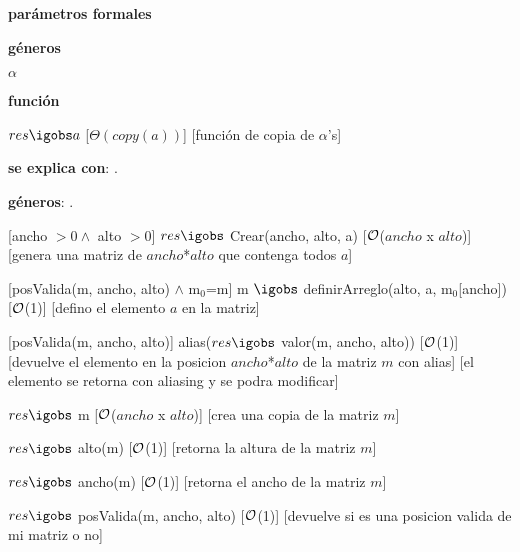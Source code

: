\begin{Interfaz}

	\textbf{parámetros formales}\parindent\\
	\parbox{1.7cm}{\textbf{géneros}} $\alpha$\\	\parbox[t]{1.7cm}{\textbf{función}}\parbox[t]{\textwidth-2\parindent-1.7cm}{%
	{$res \igobs a$}
	[$\Theta(copy(a))$]
	[función de copia de $\alpha$'s]
	}

	\textbf{se explica con}: .

	\textbf{géneros}: .


	[ancho $> 0 \land$ alto $>0$]
	{$res \igobs$ Crear(ancho, alto, a)}
	[$\mathcal{O}$($ancho$ x $alto$)]
	[genera una matriz de $ancho$*$alto$ que contenga todos $a$]

	[posValida(m, ancho, alto) $\land$ m$_0$=m]
	{m $\igobs$ definirArreglo(alto, a, m$_0$[ancho])}%
	[$\mathcal{O}$(1)]
	[defino el elemento $a$ en la matriz]
	
	[posValida(m, ancho, alto)]
	{alias($res \igobs$ valor(m, ancho, alto))}
	[$\mathcal{O}$(1)]
	[devuelve el elemento en la posicion $ancho$*$alto$ de la matriz $m$ con alias]
	[el elemento se retorna con aliasing y se podra modificar]

	{$res \igobs$ m}  
	[$\mathcal{O}$($ancho$ x $alto$)]
	[crea una copia de la matriz $m$]

	{$res \igobs$ alto(m)}  
	[$\mathcal{O}$(1)]
	[retorna la altura de la matriz $m$]

	{$res \igobs$ ancho(m)}  
	[$\mathcal{O}$(1)]
	[retorna el ancho de la matriz $m$]

	{$res \igobs$ posValida(m, ancho, alto)}  
	[$\mathcal{O}$(1)]
	[devuelve si es una posicion valida de mi matriz o no]
	
\end{Interfaz}


